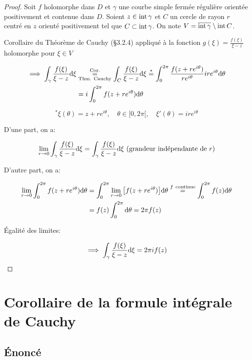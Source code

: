 \begin{proof}
Soit $f$ holomorphe dans $D$ et $\gamma$ une courbe simple fermée régulière orientée positivement et contenue dans $D$.
Soient $z \in \textrm{int}\, \gamma$ et $C$ un cercle de rayon $r$ centré en $z$ orienté positivement tel que $C \subset \textrm{int}\, \gamma$.
On note $V = \overline{\textrm{int}\, \gamma} \setminus \textrm{int}\, C$.

Corollaire du Théorème de Cauchy (§3.2.4) appliqué à la fonction $g(\xi) = \frac{f(\xi)}{\xi - z}$ holomorphe pour $\xi \in V$ 

\begin{align*}
\implies \int_\gamma \frac{f(\xi)}{\xi - z} \mathrm{d}\xi
&\overset{\textrm{Cor.}}{\underset{\textrm{Thm. Cauchy}}{=}}
\int_C \frac{f(\xi)}{\xi - z} \mathrm{d}\xi
\overset{\ast}{=}
\int_0^{2\pi} \frac{f(z + re^{i\theta})}{re^{i\theta}}ire^{i\theta} \mathrm{d}\theta
\\&=
i \int_0^{2\pi} f(z + re^{i\theta}) \mathrm{d}\theta
\end{align*}

\[^\ast \xi(\theta) = z + re^{i\theta},
\quad \theta \in [0, 2\pi[,
\quad \xi'(\theta) = ire^{i\theta}\]

D'une part, on a:

\[
\lim_{r \rightarrow 0} \int_\gamma \frac{f(\xi)}{\xi - z} \dxi = \int_\gamma \frac{f(\xi)}{\xi - z} \dxi \ \textrm{(grandeur indépendante de $r$)}
\]

D'autre part, on a:

\begin{align*}
\lim_{r \rightarrow 0} \int_0^{2\pi} f(z + re^{i\theta}) \mathrm{d}\theta &=
\int_0^{2\pi} \lim_{r \rightarrow 0} \big[f(z + re^{i\theta})\big] \mathrm{d}\theta
\overset{f \ \textrm{continue}}{=}
\int_0^{2\pi} f(z) \mathrm{d}\theta
\\&=
f(z) \int_0^{2\pi} \mathrm{d}\theta
= 2\pi f(z)
\end{align*}

Égalité des limites:

\[\implies \int_\gamma \frac{f(\xi)}{\xi - z} \mathrm{d}\xi = 2\pi i f(z)\]
\end{proof}

\section{Corollaire de la formule intégrale de Cauchy}

\subsection{Énoncé}

